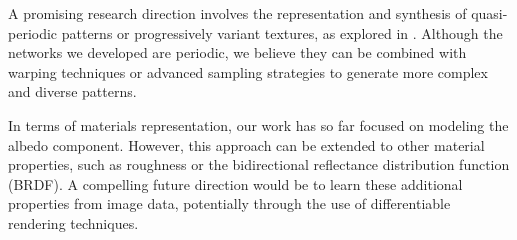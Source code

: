 A promising research direction involves the representation and synthesis of quasi-periodic patterns \red{[CITE]} or progressively variant textures, as explored in \cite{variantTextures}. Although the networks we developed are periodic, we believe they can be combined with warping techniques or advanced sampling strategies to generate more complex and diverse patterns.

In terms of materials representation, our work has so far focused on modeling the albedo component. However, this approach can be extended to other material properties, such as roughness or the bidirectional reflectance distribution function (BRDF). A compelling future direction would be to learn these additional properties from image data, potentially through the use of differentiable rendering techniques.




